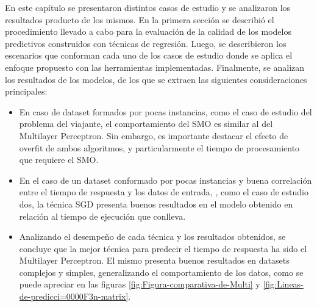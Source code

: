En este capítulo se presentaron distintos casos de estudio y se analizaron
los resultados producto de los mismos. En la primera sección se describió
el procedimiento llevado a cabo para la evaluación de la calidad de
los modelos predictivos construidos con técnicas de regresión. Luego,
se describieron los escenarios que conforman cada uno de los casos
de estudio donde se aplica el enfoque propuesto con las herramientas
implementadas. Finalmente, se analizan los resultados de los modelos,
de los que se extraen las siguientes consideraciones principales: 
\begin{itemize}
\item En caso de dataset formados por pocas instancias, como el caso de
estudio del problema del viajante, el comportamiento del \ac{SMO}
es similar al del Multilayer Perceptron. Sin embargo, es importante
destacar el efecto de overfit de ambos algoritmos, y particularmente
el tiempo de procesamiento que requiere el \ac{SMO}. 
\item En el caso de un dataset conformado por pocas instancias y buena correlación
entre el tiempo de respuesta y los datos de entrada, , como el caso
de estudio dos, la técnica \ac{SGD} presenta buenos resultados en
el modelo obtenido en relación al tiempo de ejecución que conlleva.
\item Analizando el desempeño de cada técnica y los resultados obtenidos,
se concluye que la mejor técnica para predecir el tiempo de respuesta
ha sido el Multilayer Perceptron. El mismo presenta buenos resultados
en datasets complejos y simples, generalizando el comportamiento de
los datos, como se puede apreciar en las figuras \ref{fig:Figura-comparativa-de-Multi}
y \ref{fig:Lineas-de-predicci=0000F3n-matrix}.\end{itemize}

